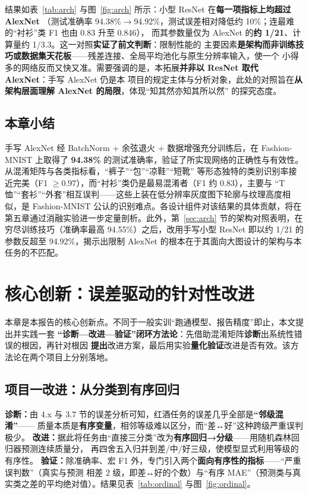 \documentclass[12pt,a4paper,fontset=fandol]{ctexart}   %
\numberwithin{figure}{section}
\numberwithin{table}{section}
\numberwithin{equation}{section}
\begin{document}
结果如表~\ref{tab:arch} 与图~\ref{fig:arch} 所示：小型 ResNet 在\textbf{每一项指标上均超过 AlexNet}
（测试准确率 94.38\%$\to$94.92\%，测试误差相对降低约 10\%；连最难的“衬衫”类 F1 也由 0.83 升至 0.846），
而其参数量仅为 AlexNet 的\textbf{约 1/21}、计算量约 1/3.3。这一对照\textbf{实证了前文判断}：限制性能的
主要因素\textbf{是架构而非训练技巧或数据集天花板}——残差连接、全局平均池化与原生分辨率输入，使一个
小得多的网络反而又快又准。需要强调的是，本拓展\textbf{并非以 ResNet 取代 AlexNet}：手写 AlexNet 仍是本
项目的规定主体与分析对象，此处的对照旨在\textbf{从架构层面理解 AlexNet 的局限}，体现“知其然亦知其所以然”
的探究态度。

\subsection{本章小结}
手写 AlexNet 经 BatchNorm + 余弦退火 + 数据增强充分训练后，在 Fashion-MNIST 上取得了 \textbf{94.38\%}
的测试准确率，验证了所实现网络的正确性与有效性。从混淆矩阵与各类指标看，“裤子”“包”“凉鞋”“短靴”
等形态独特的类别识别率接近完美（F1 $\ge 0.97$），而“衬衫”类仍是最易混淆者（F1 约 0.83），主要与
“T恤”“套衫”“外套”相互误判——这些上装在低分辨率灰度图下轮廓与纹理高度相似，是 Fashion-MNIST
公认的识别难点。各设计组件对该结果的具体贡献，将在第五章通过消融实验进一步定量剖析。此外，第~\ref{sec:arch}
节的架构对照表明，在穷尽训练技巧（准确率最高 94.55\%）之后，改用手写小型 ResNet 即以约 1/21 的参数反超至
94.92\%，揭示出限制 AlexNet 的根本在于其面向大图设计的架构与本任务的不匹配。

\section{核心创新：误差驱动的针对性改进}
本章是本报告的核心创新点。不同于一般实训“跑通模型、报告精度”即止，本文提出并实践一套
\textbf{“诊断—改进—验证”闭环方法论}：先借助混淆矩阵\textbf{诊断}出系统性错误的根因，再针对根因
\textbf{提出}改进方案，最后用实验\textbf{量化验证}改进是否有效。该方法论在两个项目上分别落地。

\subsection{项目一改进：从分类到有序回归}
\textbf{诊断：}由 4.x 与 3.7 节的误差分析可知，红酒任务的误差几乎全部是\textbf{“邻级混淆”}——
质量本质是\textbf{有序变量}，相邻等级难以区分，而“差↔好”这种跨级严重误判极少。
\textbf{改进：}据此将任务由“直接三分类”改为\textbf{有序回归→分级}——用随机森林回归器预测连续质量分，
再四舍五入归并到差/中/好三级，使模型显式利用等级的有序性。
\textbf{验证：}除准确率、宏 F1 外，专门引入两个\textbf{面向有序性的指标}——“严重误判数”（真实与预测
相差 2 级，即差↔好的个数）与“有序 MAE”（预测类与真实类之差的平均绝对值）。结果见表~\ref{tab:ordinal}
与图~\ref{fig:ordinal}。
\end{document}
